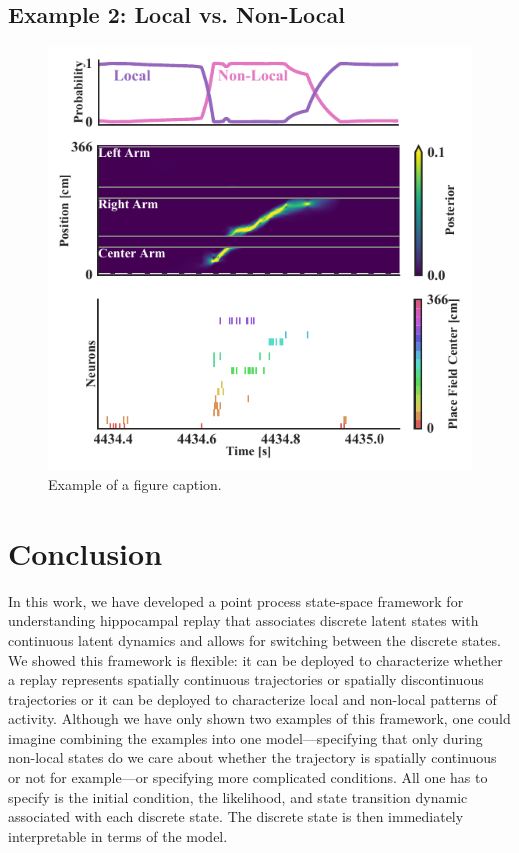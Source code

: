\documentclass[conference]{IEEEtran}
\begin{document}
\subsection{Example 2: Local vs. Non-Local}
\begin{figure}[ht]
\centerline{\includegraphics{fig2.pdf}}
\caption{Example of a figure caption.}
\label{fig2}
\end{figure}
\section{Conclusion}
In this work, we have developed a point process state-space framework for understanding hippocampal replay that associates discrete latent states with continuous latent dynamics and allows for switching between the discrete states. We showed this framework is flexible: it can be deployed to characterize whether a replay represents spatially continuous trajectories or spatially discontinuous trajectories or it can be deployed to characterize local and non-local patterns of activity. Although we have only shown two examples of this framework, one could imagine combining the examples into one model---specifying that only during non-local states do we care about whether the trajectory is spatially continuous or not for example---or specifying more complicated conditions. All one has to specify is the initial condition, the likelihood, and state transition dynamic associated with each discrete state. The discrete state is then immediately interpretable in terms of the model.
\end{document}
